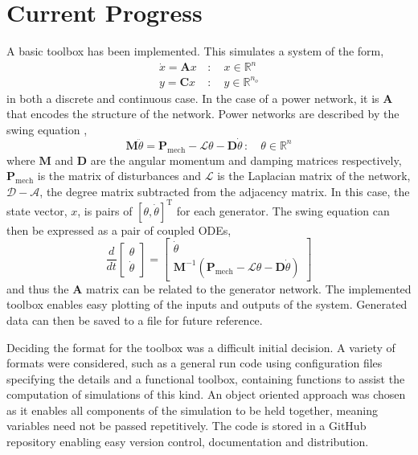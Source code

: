 \documentclass[11pt,a4paper]{article}
\begin{document}
\section*{Current Progress}
A basic toolbox has been implemented. This simulates a system of the form, 
\begin{equation*}
\begin{split}
\dot{x} = \textbf{A}x \,&: \quad x \in \mathbb{R}^{n} \\
y = \textbf{C}x \, &: \quad y \in \mathbb{R}^{n_o}
\end{split}
\end{equation*}
in both a discrete and continuous case. In the case of a power network, it is $\textbf{A}$ that encodes the structure of the network. Power networks are described by the swing equation \cite[eq 5.8]{Machowski1997},
\begin{equation*}
\textbf{M} \ddot{\theta} = \textbf{P}_{\text{mech}} - \mathcal{L}\theta - \textbf{D}\dot{\theta} \, : \quad \theta \in \mathbb{R}^n
\end{equation*}
where $\textbf{M}$ and $\textbf{D}$ are the angular momentum and damping matrices respectively, $\textbf{P}_{\text{mech}}$ is the matrix of disturbances and $\mathcal{L}$ is the Laplacian matrix of the network, $\mathcal{D}-\mathcal{A}$, the degree matrix subtracted from the adjacency matrix. In this case, the state vector, $x$, is pairs of $[\theta, \dot{\theta}]^{\text{T}}$ for each generator. The swing equation can then be expressed as a pair of coupled ODEs,
\begin{equation*}
\frac{d}{dt}\begin{bmatrix}
\theta \\
\dot{\theta}
\end{bmatrix}
= \begin{bmatrix}
\dot{\theta} \\
\textbf{M}^{-1} (\textbf{P}_{\text{mech}} - \mathcal{L}\theta - \textbf{D}\dot{\theta})
\end{bmatrix}
\end{equation*}
and thus the $\textbf{A}$ matrix can be related to the generator network.
 The implemented toolbox enables easy plotting of the inputs and outputs of the system. Generated data can then be saved to a file for future reference. 

Deciding the format for the toolbox was a difficult initial decision. A variety of formats were considered, such as a general run code using configuration files specifying the details and a functional toolbox, containing functions to assist the computation of simulations of this kind. An object oriented approach was chosen as it enables all components of the simulation to be held together, meaning variables need not be passed repetitively. The code is stored in a GitHub repository enabling easy version control, documentation and distribution.
\end{document}
